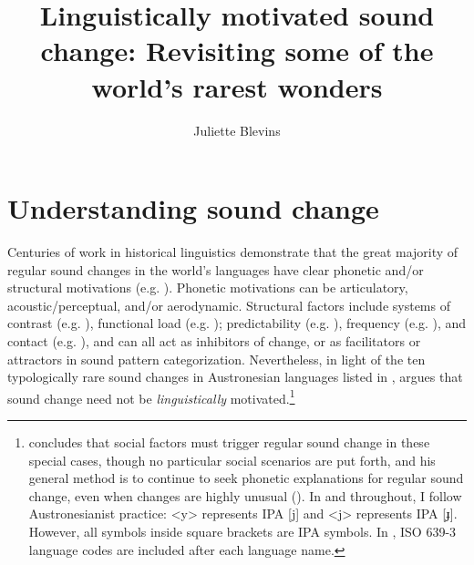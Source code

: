 \documentclass[output=paper]{langscibook}
\author{Juliette Blevins\orcid{}\affiliation{The Graduate Center, The City University of New York}}
\title[Linguistically motivated sound change]{Linguistically motivated sound change: Revisiting some of the world’s rarest wonders}
\begin{document}
\maketitle 




\section{Understanding sound change}\label{sec:blevins:1}
Centuries of work in historical linguistics demonstrate that the great majority of regular sound changes in the world’s languages have clear phonetic and\slash or structural motivations (e.g. \citealt{DuanYucai1815, OsthoffBrugman1878, Grammont1933, Ohala1974,Ohala1981, Ohala1983, Ohala1989, Ohala1993, Blevins2004,Blevins2008a, Garrett2015}). Phonetic motivations can be articulatory, acoustic\slash perceptual, and\slash or aerodynamic. Structural factors include systems of contrast (e.g. \citealt{DeCheneAnderson1979, Blust2004}), functional load (e.g. \citealt{Martinet1952, WedelEtAl2013}); predictability (e.g. \citealt{Blevins2005a}), frequency (e.g. \citealt{Blust2007}), and contact (e.g. \citealt{Thurgood1999, Blevins2017a,Blevins2017b}), and can all act as inhibitors of change, or as facilitators or attractors in sound pattern categorization. Nevertheless, in light of the ten typologically rare sound changes in Austronesian languages listed in , \citet{Blust2005} argues that sound change need not be \textit{linguistically} motivated.\footnote{\citet{Blust2005} concludes that social factors must trigger regular sound change in these special cases, though no particular social scenarios are put forth, and his general method is to continue to seek phonetic explanations for regular sound change, even when changes are highly unusual (\citealt{Blust2018,LobelEtAl2021}).  In  and throughout, I follow Austronesianist practice: <y> represents IPA [j] and <j> represents IPA [ɟ]. However, all symbols inside square brackets are IPA symbols. In , ISO 639-3 language codes are included after each language name.}
\end{document}
